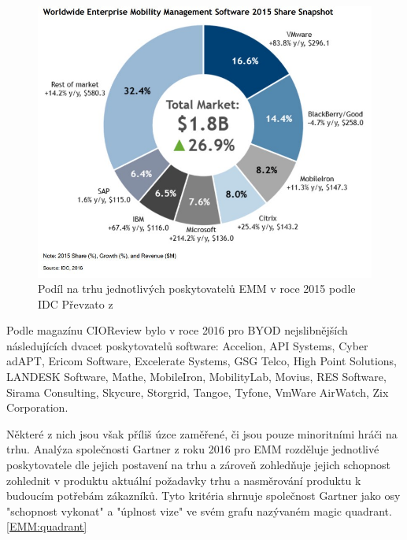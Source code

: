   \begin{figure}[h]
\includegraphics[width=13cm]{img/IDC_EMM_2016}
\caption{Podíl na trhu jednotlivých poskytovatelů EMM v roce 2015 podle IDC Převzato z \cite{}} 
\label{EMM:podil2016}
\centering
\end{figure}

Podle magazínu CIOReview bylo v roce 2016 pro BYOD nejslibnějších následujících dvacet poskytovatelů software: Accelion, API Systems, Cyber adAPT, Ericom Software, Excelerate Systems, GSG Telco, High Point Solutions, LANDESK Software,  Mathe, MobileIron, MobilityLab, Movius, RES Software, Sirama Consulting, Skycure, Storgrid, Tangoe, Tyfone, VmWare AirWatch, Zix Corporation.

Některé z nich jsou však příliš úzce zaměřené, či jsou pouze minoritními hráči na trhu. Analýza společnosti Gartner \cite{Gartner_EMM_2016} z roku 2016 pro EMM rozděluje jednotlivé poskytovatele dle jejich postavení na trhu a zároveň zohledňuje jejich schopnost zohlednit v produktu aktuální požadavky trhu a nasměrování produktu k budoucím potřebám zákazníků. Tyto kritéria shrnuje společnost Gartner jako osy "schopnost vykonat" a "úplnost vize" ve svém grafu nazývaném magic quadrant. \ref{EMM:quadrant}



